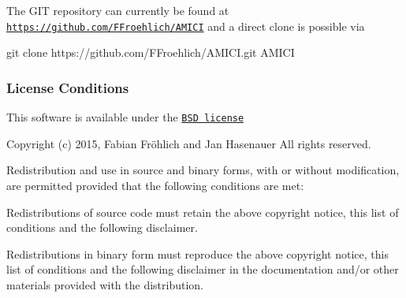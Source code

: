 The G\+I\+T repository can currently be found at \href{https://github.com/FFroehlich/AMICI}{\tt https\+://github.\+com/\+F\+Froehlich/\+A\+M\+I\+C\+I} and a direct clone is possible via 
\begin{DoxyCode}
git clone https:\textcolor{comment}{//github.com/FFroehlich/AMICI.git AMICI }
\end{DoxyCode}
\hypertarget{index_AMICI}{}\subsubsection{License Conditions}\label{index_AMICI}
This software is available under the \href{http://www.opensource.org/licenses/bsd-license.php}{\tt B\+S\+D license}

Copyright (c) 2015, Fabian Fröhlich and Jan Hasenauer All rights reserved.

Redistribution and use in source and binary forms, with or without modification, are permitted provided that the following conditions are met\+:
\begin{DoxyItemize}
\item Redistributions of source code must retain the above copyright notice, this list of conditions and the following disclaimer.
\item Redistributions in binary form must reproduce the above copyright notice, this list of conditions and the following disclaimer in the documentation and/or other materials provided with the distribution.
\end{DoxyItemize}

